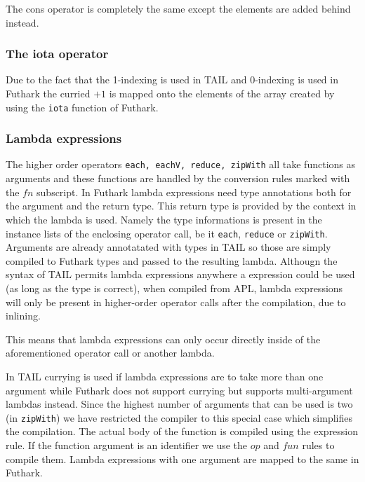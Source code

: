 \documentclass[11pt]{article}
\begin{document}
The cons operator is completely the same except the elements are added behind instead.

\subsubsection{The iota operator} 
Due to the fact that the 1-indexing is used in TAIL and 0-indexing is used in Futhark the curried $+1$ is mapped onto the elements of the array created by using the {\tt iota} function of Futhark. 

\subsubsection{Lambda expressions} 
The higher order operators {\tt each, eachV, reduce, zipWith} all take functions as arguments and these functions are handled by the
conversion rules marked with the $fn$ subscript. 
In Futhark lambda expressions need type annotations both for the argument and the return type.
This return type is provided by the context in which the lambda is used.
Namely the type informations is present in the instance lists of the enclosing operator call, be it {\tt each}, {\tt reduce} or {\tt zipWith}.
Arguments are already annotatated with types in TAIL so those are simply compiled to Futhark types and passed to the resulting lambda. Althougn the syntax of TAIL permits lambda expressions anywhere a  expression could be used (as long as the type is correct),
when compiled from APL, lambda expressions will only be present in higher-order operator calls after the compilation, due to inlining.

This means that lambda expressions can only occur directly inside of the aforementioned operator call or another lambda.

In TAIL currying is used if lambda expressions are to take more than one argument while Futhark does not support currying but
supports multi-argument lambdas instead.
Since the highest number of arguments that can be used is two (in {\tt zipWith}) we have
restricted the compiler to this special case which simplifies the compilation.
The actual body of the function is compiled using the expression rule.
If the function argument is an identifier we use the $op$ and $fun$ rules to compile them.
Lambda expressions with one argument are mapped to the same in Futhark.
\end{document}
